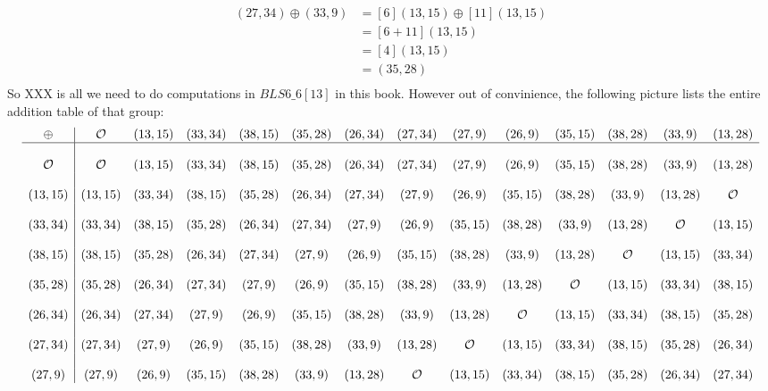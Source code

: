 \begin{align*}
(27,34)\oplus (33,9)  & = [6](13,15)\oplus [11](13,15)\\
                      & = [6+11](13,15)\\
                      & = [4](13,15)\\
                      & = (35,28)\\
\end{align*}
So XXX is all we need to do computations in $BLS6\_6[13]$ in this book. However out of convinience, the following picture lists the entire addition table of that group:
\begingroup
    \fontsize{5pt}{5pt}\selectfont
$$
\begin{array}{c|ccccccccccccc}
\oplus & \mathcal{O}  & (13,15) & (33,34) & (38,15) & (35,28) & (26,34) & (27,34) & (27,9) & (26,9) & (35,15) & (38,28) & (33,9) & (13,28)\\
\hline
\\
\mathcal{O} & \mathcal{O}  & (13,15) & (33,34) & (38,15) & (35,28) & (26,34) & (27,34) & (27,9) & (26,9) & (35,15) & (38,28) & (33,9) & (13,28)\\
\\
(13,15) & (13,15) & (33,34) & (38,15) & (35,28) & (26,34) & (27,34) & (27,9) & (26,9) & (35,15) & (38,28) & (33,9) & (13,28) & \mathcal{O}\\
\\
(33,34) & (33,34) & (38,15) & (35,28) & (26,34) & (27,34) & (27,9) & (26,9) & (35,15) & (38,28) & (33,9) & (13,28) & \mathcal{O} & (13,15)\\
\\
(38,15) & (38,15) & (35,28) & (26,34) & (27,34) & (27,9) & (26,9) & (35,15) & (38,28) & (33,9) & (13,28) & \mathcal{O} & (13,15) & (33,34)\\
\\
(35,28) & (35,28) & (26,34) & (27,34) & (27,9) & (26,9) & (35,15) & (38,28) & (33,9) & (13,28) & \mathcal{O} & (13,15) & (33,34) & (38,15)\\
\\
(26,34) & (26,34) & (27,34) & (27,9) & (26,9) & (35,15) & (38,28) & (33,9) & (13,28) & \mathcal{O} & (13,15) & (33,34) & (38,15) & (35,28)\\
\\
(27,34) & (27,34) & (27,9) & (26,9) & (35,15) & (38,28) & (33,9) & (13,28) & \mathcal{O} & (13,15) & (33,34) & (38,15) & (35,28) & (26,34)\\
\\
(27,9) & (27,9) & (26,9) & (35,15) & (38,28) & (33,9) & (13,28) & \mathcal{O} & (13,15) & (33,34) & (38,15) & (35,28) & (26,34) & (27,34)\\

\end{array}$$
